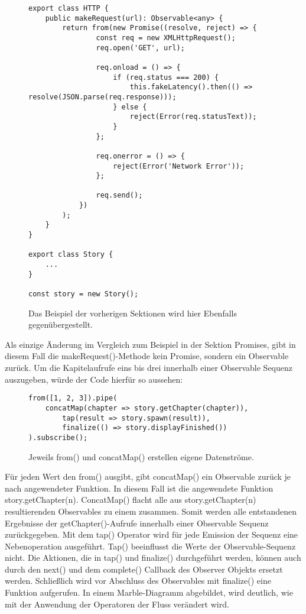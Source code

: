 \begin{figure}[H]
\begin{lstlisting}[basicstyle=\small]
export class HTTP {
    public makeRequest(url): Observable<any> {
        return from(new Promise((resolve, reject) => {
                const req = new XMLHttpRequest();
                req.open('GET', url);

                req.onload = () => {
                    if (req.status === 200) {
                        this.fakeLatency().then(() => resolve(JSON.parse(req.response)));
                    } else {
                        reject(Error(req.statusText));
                    }
                };

                req.onerror = () => {
                    reject(Error('Network Error'));
                };

                req.send();
            })
        );
    }
}

export class Story {
    ...
}

const story = new Story();
\end{lstlisting}
\caption{Das Beispiel der vorherigen Sektionen wird hier Ebenfalls gegenübergestellt.}
\end{figure}

\noindent
Als einzige Änderung im Vergleich zum Beispiel in der Sektion Promises, gibt in diesem Fall die makeRequest()-Methode kein Promise, sondern ein Observable zurück. Um die Kapitelaufrufe eins bis drei innerhalb einer Observable Sequenz auszugeben, würde der Code hierfür so aussehen:

\begin{figure}[H]
\begin{lstlisting}[basicstyle=\small]
from([1, 2, 3]).pipe(
    concatMap(chapter => story.getChapter(chapter)),
        tap(result => story.spawn(result)),
        finalize(() => story.displayFinished())
).subscribe();
\end{lstlisting}
\caption{Jeweils from() und concatMap() erstellen eigene Datenströme.}
\end{figure}

\noindent
Für jeden Wert den from() ausgibt, gibt concatMap() ein Observable zurück je nach angewendeter Funktion. In diesem Fall ist die angewendete Funktion story.getChapter(n). ConcatMap() flacht alle aus story.getChapter(n) resultierenden Observables zu einem zusammen. Somit werden alle entstandenen Ergebnisse der getChapter()-Aufrufe innerhalb einer Observable Sequenz zurückgegeben. Mit dem tap() Operator wird für jede Emission der Sequenz eine Nebenoperation ausgeführt. Tap() beeinflusst die Werte der Observable-Sequenz nicht. Die Aktionen, die in tap() und finalize() durchgeführt werden, können auch durch den next() und dem complete() Callback des Observer Objekts ersetzt werden. Schließlich wird vor Abschluss des Observables mit finalize() eine Funktion aufgerufen. In einem Marble-Diagramm abgebildet, wird deutlich, wie mit der Anwendung der Operatoren der Fluss verändert wird.

